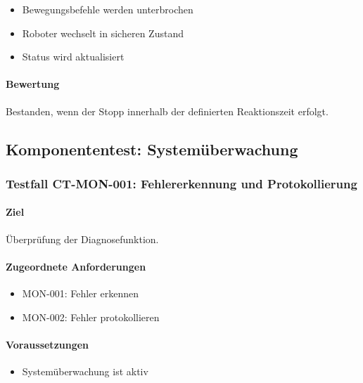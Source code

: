 \begin{itemize}
\tightlist
\item
  Bewegungsbefehle werden unterbrochen
\item
  Roboter wechselt in sicheren Zustand
\item
  Status wird aktualisiert
\end{itemize}

\paragraph{Bewertung}\label{bewertung-7}

Bestanden, wenn der Stopp innerhalb der definierten Reaktionszeit
erfolgt.

\subsection{Komponententest:
Systemüberwachung}\label{komponententest-systemuxfcberwachung}

\subsubsection{Testfall CT-MON-001: Fehlererkennung und
Protokollierung}\label{testfall-ct-mon-001-fehlererkennung-und-protokollierung}

\paragraph{Ziel}\label{ziel-8}

Überprüfung der Diagnosefunktion.

\paragraph{Zugeordnete Anforderungen}\label{zugeordnete-anforderungen-8}

\begin{itemize}
\tightlist
\item
  MON-001: Fehler erkennen
\item
  MON-002: Fehler protokollieren
\end{itemize}

\paragraph{Voraussetzungen}\label{voraussetzungen-8}

\begin{itemize}
\tightlist
\item
  Systemüberwachung ist aktiv
\end{itemize}

